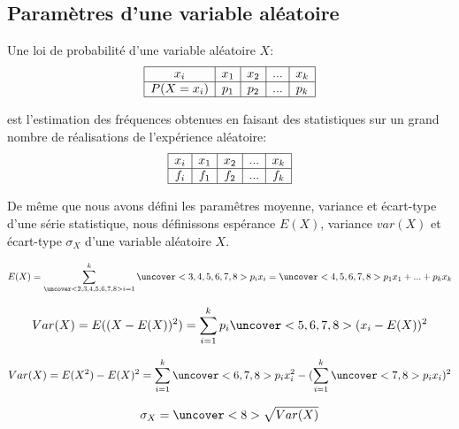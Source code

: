 \documentclass{beamer}
\begin{document}
\subsection{Paramètres d'une variable aléatoire}
               
Une loi de probabilité d'une variable aléatoire $X$:
 $$
\begin{array}{|c|c|c|c|c|}

\hline
    x_i&x_1&x_2&...&x_k\\
    \hline
    P(X=x_i)&p_1&p_2&...&p_k\\
    \hline
    \end{array} 
$$ 

est l'estimation des fréquences obtenues en faisant des statistiques sur un grand
nombre de réalisations de l'expérience aléatoire:
 $$
\begin{array}{|c|c|c|c|c|}

\hline
    x_i&x_1&x_2&...&x_k\\
    \hline
    f_i&f_1&f_2&...&f_k\\
    \hline
    \end{array} 
$$ 
 
De même que nous avons défini les paramêtres moyenne, variance et écart-type d'une série statistique, 
nous définissons espérance $E(X)$, variance $var(X)$ et écart-type $\sigma_X$ d'une variable aléatoire $X$.

\begin{frame}

  \begin{definition} 
    
   $$E(X)=\sum^k_{\uncover<2,3,4,5,6,7,8>{i=1}} \uncover<3,4,5,6,7,8>{p_i x_i}
   =\uncover<4,5,6,7,8>{p_1 x_1+...+p_k x_k}$$
   
   $$Var(X)=E((X-E(X))^2)=\sum_{i=1}^k p_i \uncover<5,6,7,8>{(x_i-E(X))^2}$$
   
   $$Var(X)=E(X^2)-E(X)^2=\sum_{i=1}^k \uncover<6,7,8>{p_i x_i^2}-(\sum_{i=1}^k \uncover<7,8>{p_i x_i})^2$$
   
   $$\sigma_X=\uncover<8>{\sqrt{Var(X)}}$$
   \end{definition}
\end{frame}
  
\end{document}
